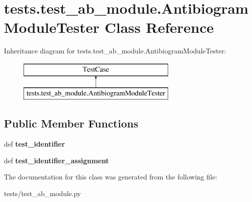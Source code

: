 \hypertarget{classtests_1_1test__ab__module_1_1_antibiogram_module_tester}{\section{tests.\-test\-\_\-ab\-\_\-module.\-Antibiogram\-Module\-Tester Class Reference}
\label{classtests_1_1test__ab__module_1_1_antibiogram_module_tester}
}
Inheritance diagram for tests.\-test\-\_\-ab\-\_\-module.\-Antibiogram\-Module\-Tester\-:\begin{figure}[H]
\begin{center}
\leavevmode
\includegraphics[height=2.000000cm]{classtests_1_1test__ab__module_1_1_antibiogram_module_tester}
\end{center}
\end{figure}
\subsection*{Public Member Functions}
\begin{DoxyCompactItemize}
\item 
\hypertarget{classtests_1_1test__ab__module_1_1_antibiogram_module_tester_a339b87e1e2ab92e72236e5cd5c1b64f5}{def {\bfseries test\-\_\-identifier}}\label{classtests_1_1test__ab__module_1_1_antibiogram_module_tester_a339b87e1e2ab92e72236e5cd5c1b64f5}

\item 
\hypertarget{classtests_1_1test__ab__module_1_1_antibiogram_module_tester_a7d58da5be4c4984651933183f89613be}{def {\bfseries test\-\_\-identifier\-\_\-assignment}}\label{classtests_1_1test__ab__module_1_1_antibiogram_module_tester_a7d58da5be4c4984651933183f89613be}

\end{DoxyCompactItemize}


The documentation for this class was generated from the following file\-:\begin{DoxyCompactItemize}
\item 
tests/test\-\_\-ab\-\_\-module.\-py\end{DoxyCompactItemize}
